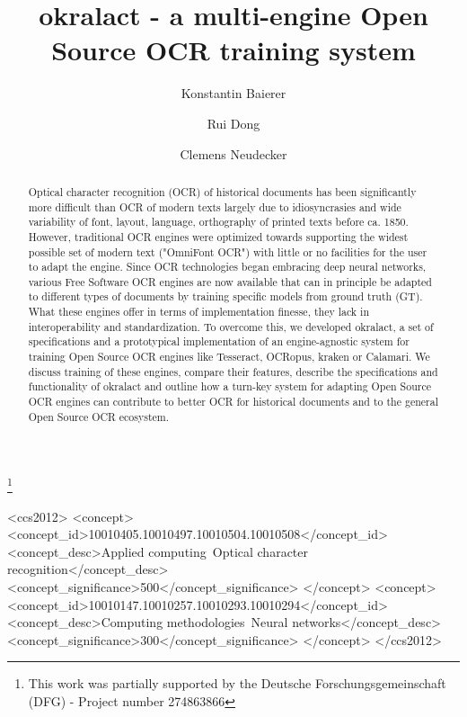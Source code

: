 \documentclass[sigconf]{acmart}
\begin{document}
\title{okralact - a multi-engine Open Source OCR training system}
\thanks{This work was partially supported by the Deutsche Forschungsgemeinschaft (DFG) - Project number 274863866}

\author{Konstantin Baierer}

\author{Rui Dong}

\author{Clemens Neudecker}

\begin{abstract}

Optical character recognition (OCR) of historical documents has
been significantly more difficult than OCR of modern texts
largely due to idiosyncrasies and wide variability of font,
layout, language, orthography of printed texts before ca.
1850. However, traditional OCR engines were optimized towards
supporting the widest possible set of modern text ("OmniFont
OCR") with little or no facilities for the user to adapt the
engine. Since OCR technologies began embracing deep neural
networks, various Free Software OCR engines are now available
that can in principle be adapted to different types of
documents by training specific models from ground truth (GT).
What these engines offer in terms of implementation finesse,
they lack in interoperability and standardization. To overcome
this, we developed okralact, a set of specifications and a
prototypical implementation of an engine-agnostic system for
training Open Source OCR engines like Tesseract, OCRopus,
kraken or Calamari. We discuss training of these engines, compare
their features, describe the specifications and functionality
of okralact and outline how a turn-key system for adapting
Open Source OCR engines can contribute to better OCR for
historical documents and to the general Open Source OCR
ecosystem.
\end{abstract}

\begin{CCSXML}
<ccs2012>
    <concept>
        <concept_id>10010405.10010497.10010504.10010508</concept_id>
        <concept_desc>Applied computing~Optical character recognition</concept_desc>
        <concept_significance>500</concept_significance>
    </concept>
    <concept>
        <concept_id>10010147.10010257.10010293.10010294</concept_id>
        <concept_desc>Computing methodologies~Neural networks</concept_desc>
        <concept_significance>300</concept_significance>
    </concept>
</ccs2012>
\end{CCSXML}
\end{document}
